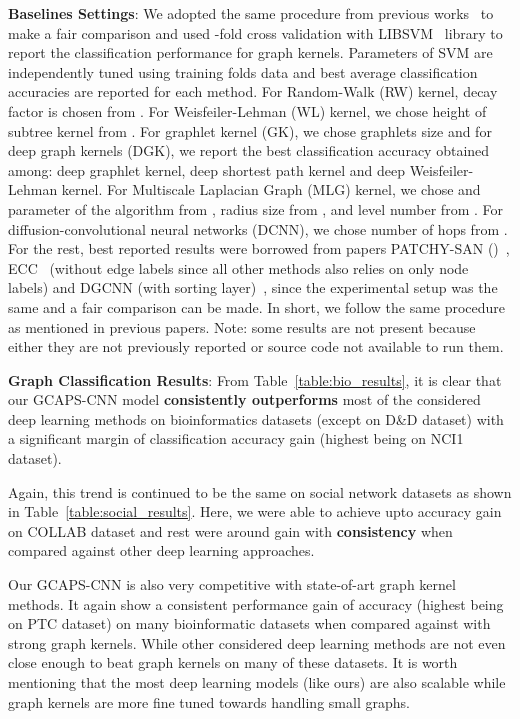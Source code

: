 \documentclass{article}
\begin{document}
\noindent \textbf{Baselines Settings}: We adopted the same procedure from previous works~\cite{niepert2016learning,yanardag2015deep,zhang2018end} to make a fair comparison and used -fold cross validation with  
LIBSVM~\cite{chang2011libsvm} library to report the classification performance for graph kernels. Parameters of SVM are independently tuned using  training folds data and   best average classification accuracies are reported   for each    method. For Random-Walk (RW) kernel, decay factor is chosen from . For Weisfeiler-Lehman (WL) kernel, we chose height of subtree kernel from .  For graphlet kernel (GK), we chose graphlets size  and for deep graph kernels (DGK), we report the best classification accuracy obtained among: deep graphlet kernel, deep shortest path kernel and deep Weisfeiler-Lehman kernel. For Multiscale Laplacian Graph (MLG) kernel, we chose  and  parameter of the algorithm from , radius size from , and level number from . For  diffusion-convolutional neural networks (DCNN), we chose number of hops from . For the rest, best reported results were borrowed from papers PATCHY-SAN  ()~\cite{niepert2016learning}, ECC~\cite{simonovsky2017dynamic} (without edge labels since all other methods also relies on only node labels) and DGCNN (with sorting layer)~\cite{zhang2018end}, since the experimental setup was the same and a fair comparison can be made. In short, we follow    the same procedure as mentioned in previous papers. Note: some results  are not present because either they are not previously reported  or source code not available to run them. 




\noindent \textbf{Graph Classification Results}: From Table~\ref{table:bio_results}, it is   clear that our GCAPS-CNN  model \textbf{consistently outperforms}  most of the considered deep learning methods on       bioinformatics datasets (except on   D\&D dataset)   with a significant margin of  classification accuracy gain (highest   being on NCI1 dataset). 

Again, this trend is continued to be the same on   social network datasets as shown in Table~\ref{table:social_results}.  Here, we were able to achieve upto   accuracy gain on COLLAB dataset and rest were around  gain   with \textbf{consistency} when compared against other deep learning approaches.

Our GCAPS-CNN is also very competitive with state-of-art graph kernel methods. It again  show a consistent performance gain of    accuracy  (highest being on PTC dataset)  on many bioinformatic datasets when compared against with strong graph kernels.  While other considered deep learning methods are   not even close enough to  beat graph kernels on many of these  datasets. It is worth mentioning that the most deep learning models (like ours) are also scalable     while graph kernels are more fine tuned towards handling small graphs.  
\end{document}
